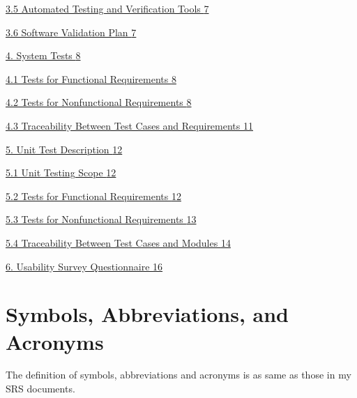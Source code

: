 \documentclass[
]{article}
\begin{document}
\protect\hyperlink{automated-testing-and-verification-tools}{3.5
Automated Testing and Verification Tools
\protect\hyperlink{automated-testing-and-verification-tools}{7}}

\protect\hyperlink{software-validation-plan}{3.6 Software Validation
Plan \protect\hyperlink{software-validation-plan}{7}}

\protect\hyperlink{system-tests}{4. System Tests
\protect\hyperlink{system-tests}{8}}

\protect\hyperlink{tests-for-functional-requirements}{4.1 Tests for
Functional Requirements
\protect\hyperlink{tests-for-functional-requirements}{8}}

\protect\hyperlink{tests-for-nonfunctional-requirements}{4.2 Tests for
Nonfunctional Requirements
\protect\hyperlink{tests-for-nonfunctional-requirements}{8}}

\protect\hyperlink{traceability-between-test-cases-and-requirements}{4.3
Traceability Between Test Cases and Requirements
\protect\hyperlink{traceability-between-test-cases-and-requirements}{11}}

\protect\hyperlink{unit-test-description}{5. Unit Test Description
\protect\hyperlink{unit-test-description}{12}}

\protect\hyperlink{unit-testing-scope}{5.1 Unit Testing Scope
\protect\hyperlink{unit-testing-scope}{12}}

\protect\hyperlink{tests-for-functional-requirements-1}{5.2 Tests for
Functional Requirements
\protect\hyperlink{tests-for-functional-requirements-1}{12}}

\protect\hyperlink{tests-for-nonfunctional-requirements-1}{5.3 Tests for
Nonfunctional Requirements
\protect\hyperlink{tests-for-nonfunctional-requirements-1}{13}}

\protect\hyperlink{traceability-between-test-cases-and-modules}{5.4
Traceability Between Test Cases and Modules
\protect\hyperlink{traceability-between-test-cases-and-modules}{14}}

\protect\hyperlink{usability-survey-questionnaire}{6. Usability Survey
Questionnaire \protect\hyperlink{usability-survey-questionnaire}{16}}

\hypertarget{symbols-abbreviations-and-acronyms}{%
\section{Symbols, Abbreviations, and
Acronyms}\label{symbols-abbreviations-and-acronyms}}

The definition of symbols, abbreviations and acronyms is as same as
those in my SRS documents.
\end{document}
